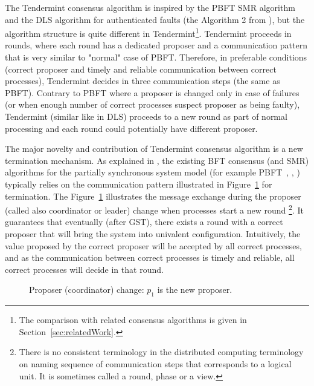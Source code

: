 The Tendermint consensus algorithm is inspired by the PBFT SMR algorithm~\cite{CL99:osdi} and the DLS algorithm for authenticated faults (the Algorithm 2 from \cite{DLS88:jacm}), but the algorithm structure is quite different in Tendermint\footnote{The comparison with related consensus algorithms is given in Section~\ref{sec:relatedWork}.}. Tendermint proceeds in rounds, where each round has a dedicated proposer and a communication pattern that is very similar to "normal" case of PBFT. Therefore, in preferable conditions (correct proposer and timely and reliable communication between correct processes), Tendermint decides in three communication steps (the same as PBFT). Contrary to PBFT where a proposer is changed only in case of failures (or when enough number of correct processes suspect proposer as being faulty), Tendermint (similar like in DLS) proceeds to a new round as part of normal processing and each round could potentially have different proposer. 

The major novelty and contribution of Tendermint consensus algorithm is a new termination mechanism. As explained in \cite{MHS09:opodis, RMS10:dsn}, the existing BFT consensus (and SMR) algorithms for the partially synchronous system model (for example PBFT~\cite{CL99:osdi}, \cite{DLS88:jacm}, \cite{MA06:tdsc}) typically relies on the communication pattern illustrated in Figure~\ref{ch3:fig:coordinator-change} for termination. The Figure~\ref{ch3:fig:coordinator-change} illustrates the message exchange during the proposer (called also coordinator or leader) change when processes start a new round \footnote{There is no consistent terminology in the distributed computing terminology on naming sequence of communication steps that corresponds to a logical unit. It is sometimes called a round, phase or a view.}. It guarantees that eventually (after GST), there exists a round with a correct proposer that will bring the system into univalent configuration. Intuitively, the value proposed by the correct proposer will be accepted by all correct processes, and as the communication between correct processes is timely and reliable, all correct processes will decide in that round.   

\begin{figure}[tbh!]
	\def\rdstretch{5}
	\def\ystretch{3}
	\centering
	\begin{rounddiag}{4}{2}
	\end{rounddiag}
	\vspace{-5mm}
	\caption{\boldmath Proposer (coordinator) change: $p_1$ is the new proposer.}
	\label{ch3:fig:coordinator-change}
\end{figure}  

